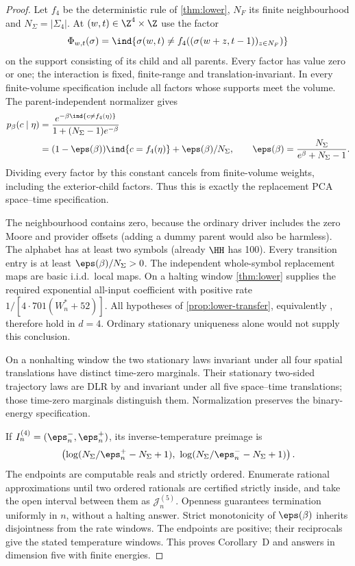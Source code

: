 \begin{proof}
Let $f_4$ be the deterministic rule of \cref{thm:lower}, $N_F$ its finite neighbourhood and $N_\Sigma=|\Sigma_4|$. At $(w,t)\in\Z^4\times\Z$ use the factor
\[
 \Phi_{w,t}(\sigma)=
 \ind\{\sigma(w,t)\ne f_4((\sigma(w+z,t-1))_{z\in N_F})\}
\]
on the support consisting of its child and all parents. Every factor has value zero or one; the interaction is fixed, finite-range and translation-invariant. In every finite-volume specification include all factors whose supports meet the volume. The parent-independent normalizer gives
\[
 \begin{aligned}
 p_\beta(c\mid\eta)
 &=\frac{e^{-\beta\ind\{c\ne f_4(\eta)\}}}
 {1+(N_\Sigma-1)e^{-\beta}}\\
 &=(1-\eps(\beta))\ind\{c=f_4(\eta)\}+\eps(\beta)/N_\Sigma,
 \qquad \eps(\beta)=\frac{N_\Sigma}{e^\beta+N_\Sigma-1}.
 \end{aligned}
\]
Dividing every factor by this constant cancels from finite-volume weights, including the exterior-child factors. Thus this is exactly the replacement PCA space--time specification.

The neighbourhood contains zero, because the ordinary driver includes the zero Moore and provider offsets (adding a dummy parent would also be harmless). The alphabet has at least two symbols (already $\HH$ has 100). Every transition entry is at least $\eps(\beta)/N_\Sigma>0$. The independent whole-symbol replacement maps are basic i.i.d.\ local maps. On a halting window \cref{thm:lower} supplies the required exponential all-input coefficient with positive rate $1/[4\cdot701(W_n^*+52)]$. All hypotheses of \cref{prop:lower-transfer}, equivalently \cite[Corollary~13.7]{DMst}, therefore hold in $d=4$. Ordinary stationary uniqueness alone would not supply this conclusion.

On a nonhalting window the two stationary laws invariant under all four spatial translations have distinct time-zero marginals. Their stationary two-sided trajectory laws are DLR by \cite[Lemma~2.4]{DMst} and invariant under all five space--time translations; those time-zero marginals distinguish them. Normalization preserves the binary-energy specification.

If $I_n^{(4)}=(\eps_n^-,\eps_n^+)$, its inverse-temperature preimage is
\[
 \left(\log(N_\Sigma/\eps_n^+-N_\Sigma+1),\
       \log(N_\Sigma/\eps_n^--N_\Sigma+1)\right).
\]
The endpoints are computable reals and strictly ordered. Enumerate rational approximations until two ordered rationals are certified strictly inside, and take the open interval between them as $\mathcal J_n^{(5)}$. Openness guarantees termination uniformly in $n$, without a halting answer. Strict monotonicity of $\eps(\beta)$ inherits disjointness from the rate windows. The endpoints are positive; their reciprocals give the stated temperature windows. This proves Corollary~D and answers \cite[Open problem~9.2]{DMhard} in dimension five with finite energies.
\end{proof}
